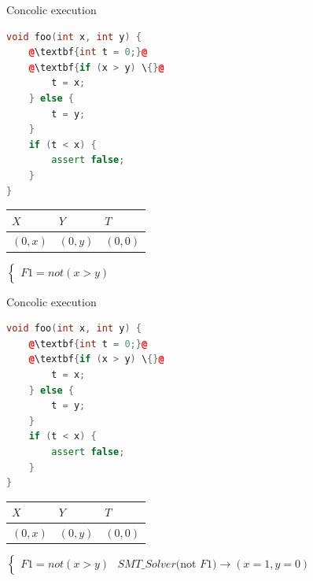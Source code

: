 \documentclass{beamer}
\begin{document}
\begin{frame}[fragile]{Concolic execution}
\begin{minipage}{0.49\textwidth}
\begin{lstlisting}[language=C++,escapechar=@]
void foo(int x, int y) {
    @\textbf{int t = 0;}@
    @\textbf{if (x > y) \{}@
        t = x;
    } else {
        t = y;
    }
    if (t < x) {
        assert false;
    }
}
\end{lstlisting}
\end{minipage}
\hfill
\begin{minipage}{0.49\textwidth}
\begin{center}
\begin{tabular}{ | l | l | l | }
\hline
$X$ & $Y$ & $T$ \\
\hline
$(0, x)$ & $(0, y)$ & $(0, 0)$ \\
\hline
\end{tabular}
$\left\{
\begin{array}{l}
F1 = not (x > y)
\end{array}
\right.$
\end{center}
\end{minipage}
\end{frame}

\begin{frame}[fragile]{Concolic execution}
\begin{minipage}{0.49\textwidth}
\begin{lstlisting}[language=C++,escapechar=@]
void foo(int x, int y) {
    @\textbf{int t = 0;}@
    @\textbf{if (x > y) \{}@
        t = x;
    } else {
        t = y;
    }
    if (t < x) {
        assert false;
    }
}
\end{lstlisting}
\end{minipage}
\hfill
\begin{minipage}{0.49\textwidth}
\begin{center}
\begin{tabular}{ | l | l | l | }
\hline
$X$ & $Y$ & $T$ \\
\hline
$(0, x)$ & $(0, y)$ & $(0, 0)$ \\
\hline
\end{tabular}
$\left\{
\begin{array}{l}
F1 = not (x > y)
\end{array}
\right.$
$SMT\_Solver($not $F1) \to (x = 1, y = 0)$
\end{center}
\end{minipage}
\end{frame}
\end{document}
